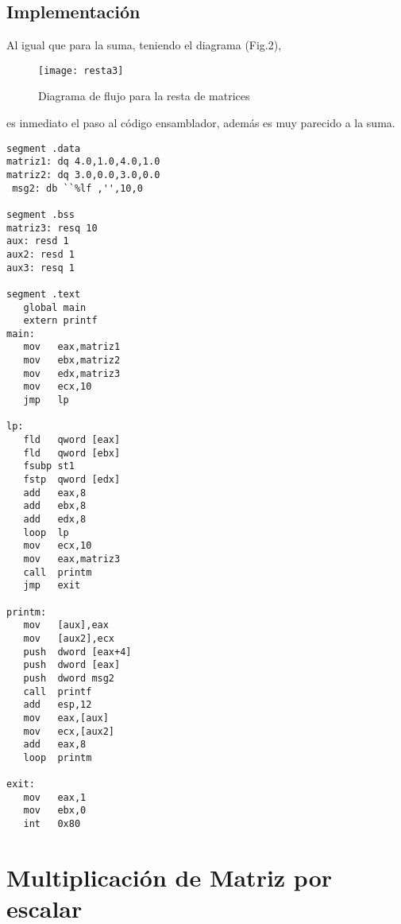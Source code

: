 \documentclass[conference]{IEEEtran}
\begin{document}
\subsection{Implementaci\'on}
Al igual que para la suma, teniendo el diagrama (Fig.2),
\begin{figure}[!h]
\centering
\texttt{[image: resta3]}
\caption{Diagrama de flujo para la resta de matrices}
\label{fig_sim}
\end{figure}
\vspace{0.1in}
es inmediato el paso al c\'odigo ensamblador, adem\'as
es muy parecido a la suma.
\begin{lstlisting}[language={[x86masm]Assembler}]
segment .data
matriz1: dq 4.0,1.0,4.0,1.0
matriz2: dq 3.0,0.0,3.0,0.0
 msg2: db ``%lf ,'',10,0

segment .bss
matriz3: resq 10
aux: resd 1
aux2: resd 1
aux3: resq 1

segment .text
   global main
   extern printf
main:
   mov   eax,matriz1
   mov   ebx,matriz2
   mov   edx,matriz3
   mov   ecx,10
   jmp   lp

lp:
   fld   qword [eax]
   fld   qword [ebx]
   fsubp st1
   fstp  qword [edx]
   add   eax,8
   add   ebx,8
   add   edx,8
   loop  lp
   mov   ecx,10
   mov   eax,matriz3
   call  printm
   jmp   exit

printm:
   mov   [aux],eax
   mov   [aux2],ecx
   push  dword [eax+4]
   push  dword [eax]
   push  dword msg2
   call  printf
   add   esp,12
   mov   eax,[aux]
   mov   ecx,[aux2]
   add   eax,8
   loop  printm

exit:
   mov   eax,1
   mov   ebx,0
   int   0x80
\end{lstlisting}

\section{Multiplicaci\'on de Matriz por escalar}


\end{document}
